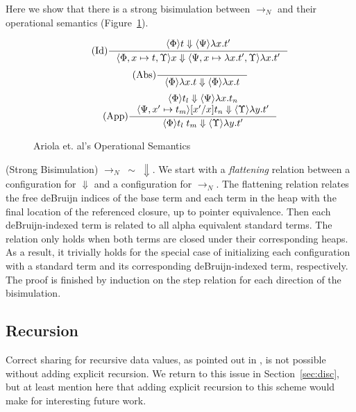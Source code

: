 Here we show that there is a strong bisimulation between
$\rightarrow_{N}$ and their operational semantics (Figure~\ref{fig:cbn}). 

\begin{figure}
\begin{align*}
\tag{Id} \inference
{\langle \Phi \rangle t \Downarrow \langle \Psi \rangle \lambda x.t'}
{\langle \Phi, x \mapsto t, \Upsilon \rangle x \Downarrow \langle \Psi, x
\mapsto \lambda x.t', \Upsilon \rangle \lambda x.t'}
\end{align*}
\begin{align*}
\tag{Abs} \inference 
{}
{\langle \Phi \rangle \lambda x . t \Downarrow \langle \Phi \rangle \lambda x.t}
\end{align*}
\begin{align*}
\tag{App} \inference
{\langle \Phi \rangle t_l \Downarrow \langle \Psi \rangle \lambda 
x.t_n \\ \langle \Psi, x' \mapsto t_m \rangle [x'/x]t_n \Downarrow \langle
\Upsilon \rangle \lambda y.t'}
{\langle \Phi \rangle t_l \; t_m \Downarrow \langle \Upsilon \rangle \lambda y.t'}
\end{align*}
\caption{Ariola et. al's Operational Semantics}
\label{fig:cbn}
\end{figure}

{\theorem \textnormal{(Strong Bisimulation)} $\xrightarrow{}_{N} \; \sim \; \Downarrow$.}
We start with a \emph{flattening} relation between a configuration for
$\Downarrow$ and a configuration for $\xrightarrow{}_{N}$. The flattening
relation relates the free deBruijn indices of the base term and each term in
the heap with the final location of the referenced closure, up to pointer
equivalence. Then each deBruijn-indexed term is related to all alpha equivalent
standard terms. The relation only holds when both terms are closed under their
corresponding heaps. As a result, it trivially holds for the special case of
initializing each configuration with a standard term and its corresponding
deBruijn-indexed term, respectively. The proof is finished by induction on the
step relation for each direction of the bisimulation.

\subsection{Recursion}

Correct sharing for recursive data values, as pointed out in
\cite{ariola1995call}, is not possible without adding explicit recursion. We
return to this issue in Section~\ref{sec:disc}, but at least mention here that
adding explicit recursion to this scheme would make for interesting future work.
